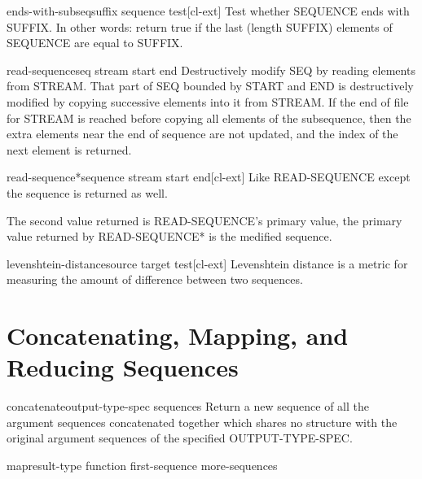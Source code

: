 \documentclass[10pt,english]{book}
\begin{document}
\begin{function}{ends-with-subseq}{suffix sequence \key test}[cl-ext]
  Test whether SEQUENCE ends with SUFFIX. In other words: return true if
  the last (length SUFFIX) elements of SEQUENCE are equal to SUFFIX.
\end{function}

\begin{function}{read-sequence}{seq stream \key start end}
  Destructively modify SEQ by reading elements from STREAM.
  That part of SEQ bounded by START and END is destructively modified by
  copying successive elements into it from STREAM. If the end of file
  for STREAM is reached before copying all elements of the subsequence,
  then the extra elements near the end of sequence are not updated, and
  the index of the next element is returned.
\end{function}

\begin{function}{read-sequence*}{sequence stream \key start end}[cl-ext]
  Like READ-SEQUENCE except the sequence is returned as well.

  The second value returned is READ-SEQUENCE's primary value, the
  primary value returned by READ-SEQUENCE* is the medified
  sequence.
\end{function}

\begin{function}{levenshtein-distance}{source target \key test}[cl-ext]
  Levenshtein distance is a metric for measuring the amount of
  difference between two sequences.
\end{function}

\section{Concatenating, Mapping, and Reducing Sequences}
\label{sec:conc-mapp-reduc}

\begin{function}{concatenate}{output-type-spec \rest sequences}
  Return a new sequence of all the argument sequences concatenated together
  which shares no structure with the original argument sequences of the
  specified OUTPUT-TYPE-SPEC.
\end{function}

\begin{function}{map}{result-type function first-sequence \rest more-sequences}
  
\end{function}
\end{document}
